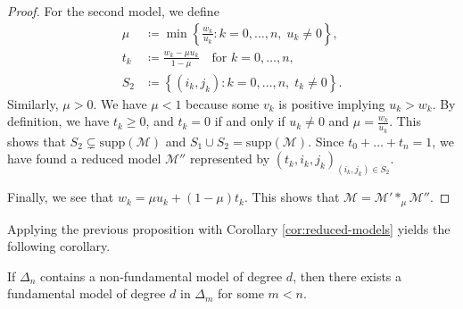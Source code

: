 \begin{proof}
    For the second model, we define
    \begin{align*}
        \mu &\coloneqq \min \left\{ \frac{w_k}{u_k} : k = 0, \dots, n, \; u_k \neq 0 \right\}, \\
        t_k &\coloneqq \frac{w_k - \mu u_k}{1 - \mu} \quad \text{for } k = 0, \dots, n, \\
        S_2 &\coloneqq \left\{ (i_k, j_k) : k=0, \dots, n, \; t_k \neq 0 \right\}.
    \end{align*}
    Similarly, \( \mu > 0 \). We have \( \mu < 1 \) because some \( v_k \) is positive implying \( u_k > w_k \). By definition, we have \( t_k \geq 0 \), and \( t_k = 0 \) if and only if \( u_k \neq 0 \) and \( \mu = \frac{w_k}{u_k} \). This shows that \( S_2 \subsetneq  \mathrm{supp}(\mathcal{M}) \) and \( S_1 \cup S_2 = \mathrm{supp}(\mathcal{M}) \). Since \( t_0 + \dots + t_n = 1 \), we have found a reduced model \( \mathcal{M}'' \) represented by \( (t_k, i_k, j_k)_{(i_k,j_k) \in S_2} \).

    Finally, we see that \( w_k = \mu u_k + (1-\mu) t_k\). This shows that \( \mathcal{M} = \mathcal{M}' *_\mu \mathcal{M}'' \).
\end{proof}

Applying the previous proposition with Corollary \ref{cor:reduced-models} yields the following corollary.

\begin{corollary}\label{cor:fundamental-models-ksmlkdf}
    If \( \Delta_n \) contains a non-fundamental model of degree \( d \), then there exists a fundamental model of degree \( d \) in \( \Delta_m \) for some \( m < n \).
\end{corollary}

